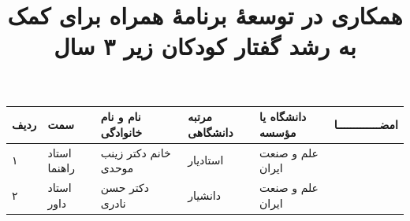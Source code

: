 \subject{مهندسی کامپیوتر}
\title{همکاری در توسعهٔ برنامهٔ همراه برای کمک به رشد گفتار کودکان زیر ۳ سال}


\firstPage
\besmPage
\davaranPage

\renewcommand{\arraystretch}{1.6}
\begin{center}
\small %
\begin{tabular}{| p{12mm} | p{18mm} | p{} |p{14mm}|p{}|c|}
\hline
ردیف	& سمت & نام و نام خانوادگی & مرتبه \newline دانشگاهی &	دانشگاه یا مؤسسه &	امضـــــــــــــا\\
\hline
۱  &	استاد راهنما				 & خانم دکتر زینب موحدی & استادیار & علم و صنعت ایران &  \\
\hline
۲ &	استاد داور			 & دکتر حسن نادری & دانشیار & علم و صنعت ایران & \\
\hline
\end{tabular}
\normalsize %
\end{center}


